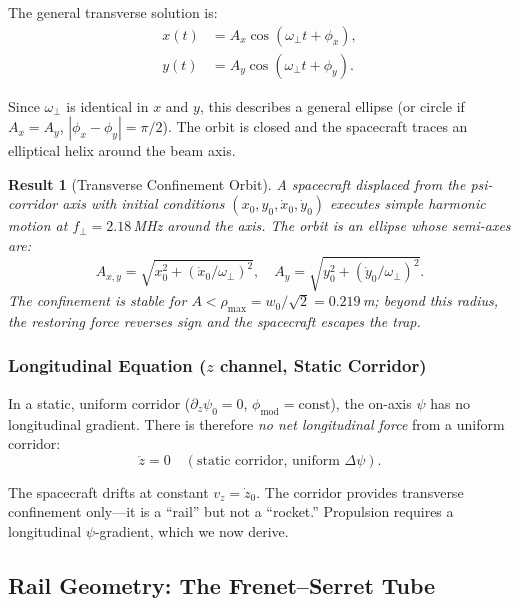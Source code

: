 \documentclass[aps,prd,twocolumn,superscriptaddress]{revtex4-2}
\newtheorem{result}{Result}
\begin{document}
The general transverse solution is:
\begin{align}
x(t) &= A_x\cos(\omega_\perp t + \phi_x), \nonumber\\
y(t) &= A_y\cos(\omega_\perp t + \phi_y).
\label{eq:trans_solution}
\end{align}

Since $\omega_\perp$ is identical in $x$ and $y$, this describes a
general ellipse (or circle if $A_x = A_y$, $|\phi_x - \phi_y| = \pi/2$).
The orbit is closed and the spacecraft traces an elliptical helix
around the beam axis.

\begin{result}[Transverse Confinement Orbit]
A spacecraft displaced from the psi-corridor axis with initial
conditions $(x_0, y_0, \dot{x}_0, \dot{y}_0)$ executes simple harmonic
motion at $f_\perp = 2.18$\,MHz around the axis.  The orbit is an
ellipse whose semi-axes are:
\begin{equation}
A_{x,y} = \sqrt{x_0^2 + (\dot{x}_0/\omega_\perp)^2},
\quad A_{y} = \sqrt{y_0^2 + (\dot{y}_0/\omega_\perp)^2}.
\label{eq:amplitude}
\end{equation}
The confinement is stable for $A < \rho_\mathrm{max} = w_0/\sqrt{2}
= 0.219$\,m; beyond this radius, the restoring force reverses sign
and the spacecraft escapes the trap.
\end{result}

\subsubsection{Longitudinal Equation ($z$ channel, Static Corridor)}

In a static, uniform corridor ($\partial_z\psi_0 = 0$, $\phi_\mathrm{mod}
= \mathrm{const}$), the on-axis $\psi$ has no longitudinal gradient.
There is therefore \emph{no net longitudinal force} from a uniform corridor:
\begin{equation}
\ddot{z} = 0 \quad (\text{static corridor, uniform } \Delta\psi).
\label{eq:z_static}
\end{equation}

The spacecraft drifts at constant $v_z = \dot{z}_0$.  The corridor
provides transverse confinement only---it is a ``rail'' but not a
``rocket.''  Propulsion requires a longitudinal $\psi$-gradient,
which we now derive.

\subsection{Rail Geometry: The Frenet--Serret Tube}
\label{sec:rail}
\end{document}
